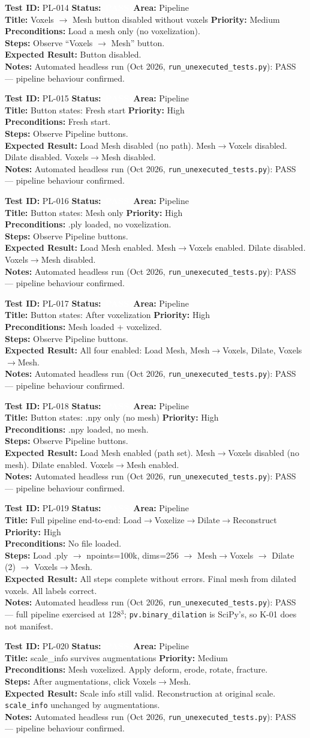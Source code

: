 \documentclass[12pt,a4paper]{article}
\newcommand{\statuspass}{\colorbox{statusgreen}{\textcolor{white}{\textbf{\,PASS\,}}}}
\newcommand{\testcase}[9]{%
  \smallskip
  \noindent\textbf{Test ID:} #1 \hfill \textbf{Status:} #2 \hfill \textbf{Area:} #3 \\
  \textbf{Title:} #4 \hfill \textbf{Priority:} #5 \\[0.3em]
  \textbf{Preconditions:} #6 \\[0.3em]
  \textbf{Steps:} #7 \\[0.3em]
  \textbf{Expected Result:} #8 \\
  \textbf{Notes:} #9
  \smallskip
}
\begin{document}
\testcase{PL-014}{\statuspass}{Pipeline}{Voxels $\rightarrow$ Mesh button disabled without voxels}{Medium}{Load a mesh only (no voxelization).}{Observe ``Voxels $\rightarrow$ Mesh'' button.}{Button disabled.}{Automated headless run (Oct 2026, \texttt{run\_unexecuted\_tests.py}): PASS --- pipeline behaviour confirmed.}


\testcase{PL-015}{\statuspass}{Pipeline}{Button states: Fresh start}{High}{Fresh start.}{Observe Pipeline buttons.}{Load Mesh disabled (no path). Mesh$\rightarrow$Voxels disabled. Dilate disabled. Voxels$\rightarrow$Mesh disabled.}{Automated headless run (Oct 2026, \texttt{run\_unexecuted\_tests.py}): PASS --- pipeline behaviour confirmed.}


\testcase{PL-016}{\statuspass}{Pipeline}{Button states: Mesh only}{High}{.ply loaded, no voxelization.}{Observe Pipeline buttons.}{Load Mesh enabled. Mesh$\rightarrow$Voxels enabled. Dilate disabled. Voxels$\rightarrow$Mesh disabled.}{Automated headless run (Oct 2026, \texttt{run\_unexecuted\_tests.py}): PASS --- pipeline behaviour confirmed.}


\testcase{PL-017}{\statuspass}{Pipeline}{Button states: After voxelization}{High}{Mesh loaded + voxelized.}{Observe Pipeline buttons.}{All four enabled: Load Mesh, Mesh$\rightarrow$Voxels, Dilate, Voxels$\rightarrow$Mesh.}{Automated headless run (Oct 2026, \texttt{run\_unexecuted\_tests.py}): PASS --- pipeline behaviour confirmed.}


\testcase{PL-018}{\statuspass}{Pipeline}{Button states: .npy only (no mesh)}{High}{.npy loaded, no mesh.}{Observe Pipeline buttons.}{Load Mesh enabled (path set). Mesh$\rightarrow$Voxels disabled (no mesh). Dilate enabled. Voxels$\rightarrow$Mesh enabled.}{Automated headless run (Oct 2026, \texttt{run\_unexecuted\_tests.py}): PASS --- pipeline behaviour confirmed.}


\testcase{PL-019}{\statuspass}{Pipeline}{Full pipeline end-to-end: Load$\rightarrow$Voxelize$\rightarrow$Dilate$\rightarrow$Reconstruct}{High}{No file loaded.}{Load .ply $\rightarrow$ npoints=100k, dims=256 $\rightarrow$ Mesh$\rightarrow$Voxels $\rightarrow$ Dilate (2) $\rightarrow$ Voxels$\rightarrow$Mesh.}{All steps complete without errors. Final mesh from dilated voxels. All labels correct.}{Automated headless run (Oct 2026, \texttt{run\_unexecuted\_tests.py}): PASS --- full pipeline exercised at 128$^3$; \texttt{pv.binary\_dilation} is SciPy's, so K-01 does not manifest.}


\testcase{PL-020}{\statuspass}{Pipeline}{scale\_info survives augmentations}{Medium}{Mesh voxelized. Apply deform, erode, rotate, fracture.}{After augmentations, click Voxels$\rightarrow$Mesh.}{Scale info still valid. Reconstruction at original scale. \texttt{scale\_info} unchanged by augmentations.}{Automated headless run (Oct 2026, \texttt{run\_unexecuted\_tests.py}): PASS --- pipeline behaviour confirmed.}
\end{document}
